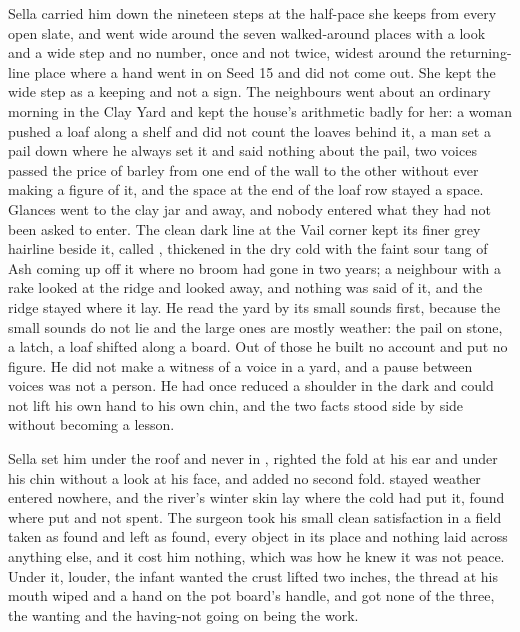 Sella carried him down the nineteen steps at the half-pace she keeps from every open slate, and went wide around the seven walked-around places with a look and a wide step and no number, once and not twice, widest around the returning-line place where a hand went in on Seed 15 and did not come out. She kept the wide step as a keeping and not a sign. The neighbours went about an ordinary morning in the Clay Yard and kept the house's arithmetic badly for her: a woman pushed a loaf along a shelf and did not count the loaves behind it, a man set a pail down where he always set it and said nothing about the pail, two voices passed the price of barley from one end of the wall to the other without ever making a figure of it, and the space at the end of the loaf row stayed a space. Glances went to the clay jar and away, and nobody entered what they had not been asked to enter. The clean dark line at the Vail corner kept its finer grey hairline beside it, called , thickened in the dry cold with the faint sour tang of Ash coming up off it where no broom had gone in two years; a neighbour with a rake looked at the ridge and looked away, and nothing was said of it, and the ridge stayed where it lay. He read the yard by its small sounds first, because the small sounds do not lie and the large ones are mostly weather: the pail on stone, a latch, a loaf shifted along a board. Out of those he built no account and put no figure. He did not make a witness of a voice in a yard, and a pause between voices was not a person. He had once reduced a shoulder in the dark and could not lift his own hand to his own chin, and the two facts stood side by side without becoming a lesson.

Sella set him under the roof and never in , righted the fold at his ear and under his chin without a look at his face, and added no second fold.  stayed weather entered nowhere, and the river's winter skin lay where the cold had put it, found where put and not spent. The surgeon took his small clean satisfaction in a field taken as found and left as found, every object in its place and nothing laid across anything else, and it cost him nothing, which was how he knew it was not peace. Under it, louder, the infant wanted the crust lifted two inches, the thread at his mouth wiped and a hand on the pot board's handle, and got none of the three, the wanting and the having-not going on being the work.


